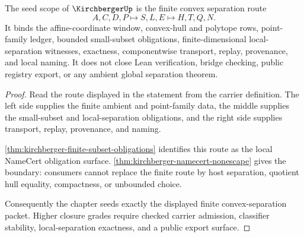 \begin{theorem}
\label{thm:kirchberger-seed-scope}
The seed scope of $\KirchbergerUp$ is the finite convex separation route
$$
A,C,D,P \longmapsto S,L,E \longmapsto H,T,Q,N .
$$
It binds the affine-coordinate window, convex-hull and polytope rows, point-family ledger, bounded small-subset obligations, finite-dimensional local-separation witnesses, exactness, componentwise transport, replay, provenance, and local naming. It does not close Lean verification, bridge checking, public registry export, or any ambient global separation theorem.
\end{theorem}
\begin{proof}
Read the route displayed in the statement from the carrier definition. The left side supplies the finite ambient and point-family data, the middle supplies the small-subset and local-separation obligations, and the right side supplies transport, replay, provenance, and naming.

\autoref{thm:kirchberger-finite-subset-obligations} identifies this route as the local NameCert obligation surface. \autoref{thm:kirchberger-namecert-nonescape} gives the boundary: consumers cannot replace the finite route by host separation, quotient hull equality, compactness, or unbounded choice.

Consequently the chapter seeds exactly the displayed finite convex-separation packet. Higher closure grades require checked carrier admission, classifier stability, local-separation exactness, and a public export surface.
\end{proof}




